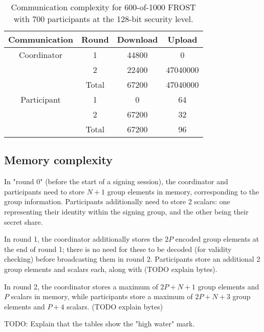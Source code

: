 \begin{table}
	\centering
	\begin{tabular}{c c c c}
		\toprule
		Communication & Round & Download & Upload \\ \midrule
		Coordinator & 1 & 44800 & 0 \\
		            & 2 & 22400 & 47040000 \\
		            & Total & 67200 & 47040000 \\
		\midrule
		Participant & 1 & 0 & 64 \\
		            & 2 & 67200 & 32 \\
		            & Total & 67200 & 96 \\
		\bottomrule
	\end{tabular}
	\caption{Communication complexity for 600-of-1000 FROST with 700 participants at the 128-bit security level.}
\end{table}

\subsection{Memory complexity}

In "round 0" (before the start of a signing session), the coordinator and
participants need to store $N + 1$ group elements in memory, corresponding to
the group information. Participants additionally need to store 2 scalars: one
representing their identity within the signing group, and the other being their
secret share.

In round 1, the coordinator additionally stores the $2P$ encoded group elements
at the end of round 1; there is no need for these to be decoded (for validity
checking) before broadcasting them in round 2. Participants store an additional
2 group elements and scalars each, along with (TODO explain bytes).

In round 2, the coordinator stores a maximum of $2P + N + 1$ group elements and
$P$ scalars in memory, while participants store a maximum of $2P + N + 3$ group
elements and $P + 4$ scalars. (TODO explain bytes)

TODO: Explain that the tables show the "high water" mark.

